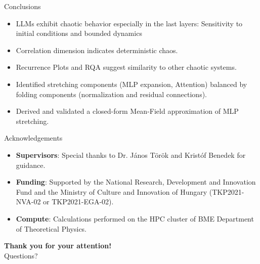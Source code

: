 \documentclass[10pt,aspectratio=169]{beamer}
\begin{document}
\begin{frame}{Conclusions}
  \begin{itemize}
    \item LLMs exhibit chaotic behavior especially in the last layers: Sensitivity to initial conditions and bounded dynamics
    \item Correlation dimension indicates deterministic chaos.
    \item Recurrence Plots and RQA suggest similarity to other chaotic systems.
    \item Identified stretching components (MLP expansion, Attention) balanced by folding components (normalization and residual connections).
    \item Derived and validated a closed-form Mean-Field approximation of MLP stretching.
    
  \end{itemize}
\end{frame}

\begin{frame}{Acknowledgements}
  \begin{itemize}
    \item \textbf{Supervisors}: Special thanks to Dr. János Török and Kristóf Benedek for guidance.
    \item \textbf{Funding}: Supported by the National Research, Development and Innovation Fund and the Ministry of Culture and Innovation of Hungary (TKP2021-NVA-02 or TKP2021-EGA-02).
    \item \textbf{Compute}: Calculations performed on the HPC cluster of BME Department of Theoretical Physics.
  \end{itemize}
  \vfill
  \centering
  \textbf{Thank you for your attention!} \\
  Questions?
\end{frame}
\end{document}
